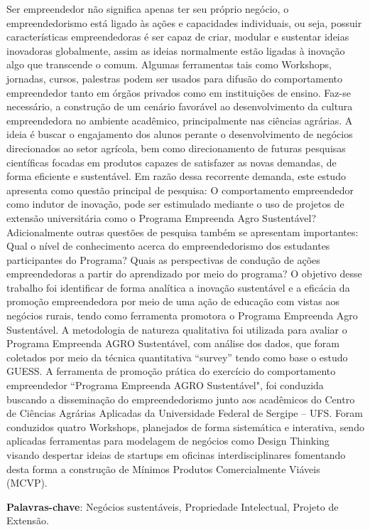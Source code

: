 \setlength{\absparsep}{18pt} %
\begin{resumo}


Ser empreendedor não significa apenas ter seu próprio negócio, o empreendedorismo está ligado às ações e capacidades individuais, ou seja, possuir características empreendedoras é ser capaz de criar, modular e sustentar ideias inovadoras globalmente, assim as ideias normalmente estão ligadas à inovação algo que transcende o comum. Algumas ferramentas tais como Workshops, jornadas, cursos, palestras podem ser usados para difusão do comportamento empreendedor tanto em órgãos privados como em instituições de ensino. Faz-se necessário, a construção de um cenário favorável ao desenvolvimento da cultura empreendedora no ambiente acadêmico, principalmente nas ciências agrárias. A ideia é buscar o engajamento dos alunos perante o desenvolvimento de negócios direcionados ao setor agrícola, bem como direcionamento de futuras pesquisas científicas focadas em produtos capazes de satisfazer as novas demandas, de forma eficiente e sustentável. Em razão dessa recorrente demanda, este estudo apresenta como questão principal de pesquisa: O comportamento empreendedor como indutor de inovação, pode ser estimulado mediante o uso de projetos de extensão universitária como o Programa Empreenda Agro Sustentável? Adicionalmente outras questões de pesquisa também se apresentam importantes: Qual o nível de conhecimento acerca do empreendedorismo dos estudantes participantes do Programa? Quais as perspectivas de condução de ações empreendedoras a partir do aprendizado por meio do programa? O objetivo desse trabalho foi identificar de forma analítica a inovação sustentável e a eficácia da promoção empreendedora por meio de uma ação de educação com vistas aos negócios rurais, tendo como ferramenta promotora o Programa Empreenda Agro Sustentável. A metodologia de natureza qualitativa foi utilizada para avaliar o Programa Empreenda AGRO
Sustentável, com análise dos dados, que foram coletados por meio da técnica quantitativa 
“survey” tendo como base o estudo GUESS. A ferramenta de promoção prática do exercício do comportamento empreendedor “Programa Empreenda AGRO Sustentável", foi conduzida buscando a disseminação do empreendedorismo junto aos acadêmicos do Centro de Ciências Agrárias Aplicadas da Universidade Federal de Sergipe – UFS. Foram conduzidos quatro Workshops, planejados de forma sistemática e interativa, sendo aplicadas ferramentas para modelagem de negócios como Design Thinking visando despertar ideias de startups em oficinas interdisciplinares fomentando desta forma a construção de Mínimos Produtos Comercialmente Viáveis (MCVP).



 \textbf{Palavras-chave}: Negócios sustentáveis, Propriedade Intelectual, Projeto de Extensão.
\end{resumo}